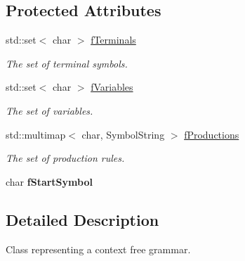 \subsection*{Protected Attributes}
\begin{DoxyCompactItemize}
\item 
\hypertarget{class_c_f_g_ac016cd234680353c2335233b9e46cb47}{std\-::set$<$ char $>$ \hyperlink{class_c_f_g_ac016cd234680353c2335233b9e46cb47}{f\-Terminals}}\label{class_c_f_g_ac016cd234680353c2335233b9e46cb47}

\begin{DoxyCompactList}\small\item\em The set of terminal symbols. \end{DoxyCompactList}\item 
\hypertarget{class_c_f_g_a2782ff517d0b17f6ae3853dae83ed144}{std\-::set$<$ char $>$ \hyperlink{class_c_f_g_a2782ff517d0b17f6ae3853dae83ed144}{f\-Variables}}\label{class_c_f_g_a2782ff517d0b17f6ae3853dae83ed144}

\begin{DoxyCompactList}\small\item\em The set of variables. \end{DoxyCompactList}\item 
\hypertarget{class_c_f_g_acead5f2b9238ec9bbc56d9e1de16f44f}{std\-::multimap$<$ char, Symbol\-String $>$ \hyperlink{class_c_f_g_acead5f2b9238ec9bbc56d9e1de16f44f}{f\-Productions}}\label{class_c_f_g_acead5f2b9238ec9bbc56d9e1de16f44f}

\begin{DoxyCompactList}\small\item\em The set of production rules. \end{DoxyCompactList}\item 
\hypertarget{class_c_f_g_acb92bc7a21984ef4a6d6a86b2e2e1b53}{char {\bfseries f\-Start\-Symbol}}\label{class_c_f_g_acb92bc7a21984ef4a6d6a86b2e2e1b53}

\end{DoxyCompactItemize}


\subsection{Detailed Description}
Class representing a context free grammar. 

